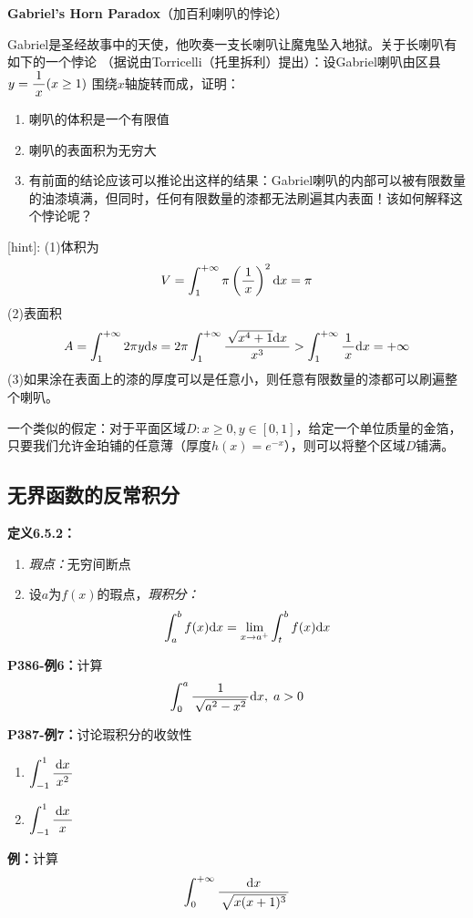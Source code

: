 \begin{shaded}
	{\bf Gabriel's Horn Paradox}（加百利喇叭的悖论）
	
	Gabriel是圣经故事中的天使，他吹奏一支长喇叭让魔鬼坠入地狱。关于长喇叭有如下的一个悖论
	（据说由Torricelli（托里拆利）提出）：设Gabriel喇叭由区县$y=\displaystyle\frac{\,{1}\,}{\,{x}\,}(x\geq 1)$
	围绕$x$轴旋转而成，证明：
	\begin{enumerate} [(1)]
  	  \setlength{\itemindent}{1cm}
	  \item 喇叭的体积是一个有限值
	  \item 喇叭的表面积为无穷大
	  \item 有前面的结论应该可以推论出这样的结果：Gabriel喇叭的内部可以被有限数量
	  的油漆填满，但同时，任何有限数量的漆都无法刷遍其内表面！该如何解释这个悖论呢？
	\end{enumerate}
	[hint]:
	(1)体积为
	$$V=\displaystyle\int_1^{+\infty}\pi\left(\displaystyle\frac{\,{1}\,}{\,{x}\,}\right)^2\mathrm{d} x=\pi$$
	(2)表面积
	$$A=\displaystyle\int_1^{+\infty}2\pi y\mathrm{d} s=2\pi\displaystyle\int_1^{+\infty}
	\displaystyle\frac{\,{\sqrt{x^4+1}\mathrm{d} x}\,}{\,{x^3}\,}>\displaystyle\int_1^{+\infty}\displaystyle\frac{\,{1}\,}{\,{x}\,}\mathrm{d} x=+\infty$$
	(3)如果涂在表面上的漆的厚度可以是任意小，则任意有限数量的漆都可以刷遍整个喇叭。
	
	一个类似的假定：对于平面区域$D:x\geq0,y\in[0,1]$，给定一个单位质量的金箔，
	只要我们允许金珀铺的任意薄（厚度$h(x)=e^{-x}$），则可以将整个区域$D$铺满。
\end{shaded}

\subsection{无界函数的反常积分}

{\bf 定义6.5.2：}
\begin{enumerate} [(1)]
  \setlength{\itemindent}{1cm}
  \item {\it 瑕点：}无穷间断点 
  \item 设$a$为$f(x)$的瑕点，{\it 瑕积分：}
  $$\displaystyle\int_a^bf(x)\mathrm{d} x=\lim\limits_{x\to{a^+}}\displaystyle\int_t^bf(x)\mathrm{d} x$$
\end{enumerate}

{\bf P386-例6：}计算
$$\displaystyle\int_0^a\displaystyle\frac{\,{1}\,}{\,{\sqrt{a^2-x^2}}\,}\mathrm{d} x,\;a>0$$

{\bf P387-例7：}讨论瑕积分的收敛性
\begin{enumerate}[(1)]
  \setlength{\itemindent}{1cm}
  \item $\displaystyle\int_{-1}^1\displaystyle\frac{\,{\mathrm{d} x}\,}{\,{x^2}\,}$ 
  \item $\displaystyle\int_{-1}^1\displaystyle\frac{\,{\mathrm{d} x}\,}{\,{x}\,}$
\end{enumerate}

{\bf 例：}计算
$$\displaystyle\int_0^{+\infty}\displaystyle\frac{\,{\mathrm{d} x}\,}{\,{\sqrt{x(x+1)^3}}\,}$$

